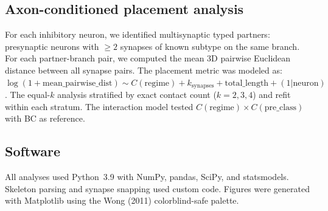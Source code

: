 \documentclass[11pt]{article}
\begin{document}
\subsection{Axon-conditioned placement analysis}

For each inhibitory neuron, we identified multisynaptic typed partners: presynaptic neurons with $\geq 2$ synapses of known subtype on the same branch. For each partner-branch pair, we computed the mean 3D pairwise Euclidean distance between all synapse pairs. The placement metric was modeled as: $\log(1 + \text{mean\_pairwise\_dist}) \sim C(\text{regime}) + k_{\text{synapses}} + \text{total\_length} + (1|\text{neuron})$. The equal-$k$ analysis stratified by exact contact count ($k = 2, 3, 4$) and refit within each stratum. The interaction model tested $C(\text{regime}) \times C(\text{pre\_class})$ with BC as reference.

\subsection{Software}

All analyses used Python~3.9 with NumPy, pandas, SciPy, and statsmodels. Skeleton parsing and synapse snapping used custom code. Figures were generated with Matplotlib using the Wong (2011) colorblind-safe palette.


\end{document}
